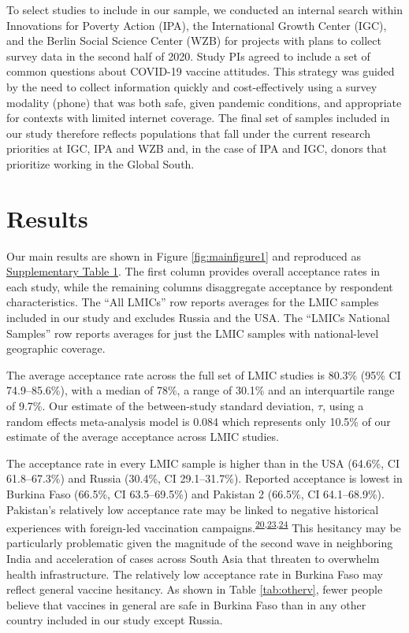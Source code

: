 \documentclass[
  12pt,
]{article}
\begin{document}
To select studies to include in our sample, we conducted an internal search within Innovations for Poverty Action (IPA), the International Growth Center (IGC), and the Berlin Social Science Center (WZB) for projects with plans to collect survey data in the second half of 2020. Study PIs agreed to include a set of common questions about COVID-19 vaccine attitudes. This strategy was guided by the need to collect information quickly and cost-effectively using a survey modality (phone) that was both safe, given pandemic conditions, and appropriate for contexts with limited internet coverage. The final set of samples included in our study therefore reflects populations that fall under the current research priorities at IGC, IPA and WZB and, in the case of IPA and IGC, donors that prioritize working in the Global South.

\hypertarget{results}{%
\section*{Results}\label{results}}

Our main results are shown in Figure \ref{fig:mainfigure1} and reproduced as \hyperref[tab:maintabledis]{Supplementary Table 1}. The first column provides overall acceptance rates in each study, while the remaining columns disaggregate acceptance by respondent characteristics. The ``All LMICs'' row reports averages for the LMIC samples included in our study and excludes Russia and the USA. The ``LMICs National Samples'' row reports averages for just the LMIC samples with national-level geographic coverage.

The average acceptance rate across the full set of LMIC studies is 80.3\% (95\% CI 74.9--85.6\%), with a median of 78\%, a range of 30.1\% and an interquartile range of 9.7\%. Our estimate of the between-study standard deviation, \(\tau\), using a random effects meta-analysis model is 0.084 which represents only 10.5\% of our estimate of the average acceptance across LMIC studies.

The acceptance rate in every LMIC sample is higher than in the USA (64.6\%, CI 61.8--67.3\%) and Russia (30.4\%, CI 29.1--31.7\%). Reported acceptance is lowest in Burkina Faso (66.5\%, CI 63.5--69.5\%) and Pakistan 2 (66.5\%, CI 64.1--68.9\%). Pakistan's relatively low acceptance rate may be linked to negative historical experiences with foreign-led vaccination campaigns.\textsuperscript{\protect\hyperlink{ref-martinez2021vaccines}{20},\protect\hyperlink{ref-ali2019polio}{23},\protect\hyperlink{ref-robbins2012cia}{24}} This hesitancy may be particularly problematic given the magnitude of the second wave in neighboring India and acceleration of cases across South Asia that threaten to overwhelm health infrastructure. The relatively low acceptance rate in Burkina Faso may reflect general vaccine hesitancy. As shown in Table \ref{tab:otherv}, fewer people believe that vaccines in general are safe in Burkina Faso than in any other country included in our study except Russia.
\end{document}
